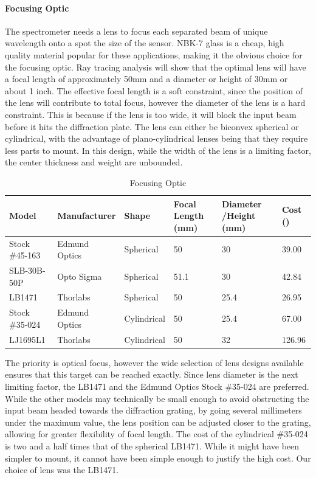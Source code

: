 \paragraph{Focusing Optic}
The spectrometer needs a lens to focus each separated beam of unique wavelength onto a spot the size of the sensor. NBK-7 glass is a cheap, high quality material popular for these applications, making it the obvious choice for the focusing optic. Ray tracing analysis will show that the optimal lens will have a focal length of approximately 50mm and a diameter or height of 30mm or about 1 inch. The effective focal length is a soft constraint, since the position of the lens will contribute to total focus, however the diameter of the lens is a hard constraint. This is because if the lens is too wide, it will block the input beam before it hits the diffraction plate. The lens can either be biconvex spherical or cylindrical, with the advantage of plano-cylindrical lenses being that they require less parts to mount. In this design, while the width of the lens is a limiting factor, the center thickness and weight are unbounded.

\begin{table}[H]
	\centering
	\label{table:Focusing Optic}
	\caption{Focusing Optic}
	\bigskip
	\begin{tabular}{|p{3cm}|p{2.5cm}|p{2cm}|p{1.5cm}|p{1.75cm}|p{1.25cm}|}
	\hline
	Model & Manufacturer & Shape & Focal Length (mm) & Diameter /Height (mm) & Cost (\textdollar)\\
	\hline
	Stock \#45-163 & Edmund Optics & Spherical & 50 & 30 & 39.00\\
	\hline
	SLB-30B-50P & Opto Sigma & Spherical & 51.1 & 30 & 42.84\\
	\hline
	LB1471 & Thorlabs & Spherical & 50 & 25.4 & 26.95\\
	\hline
	Stock \#35-024 & Edmund Optics & Cylindrical & 50 & 25.4 & 67.00\\
	\hline
	LJ1695L1 & Thorlabs & Cylindrical & 50 & 32 & 126.96\\
	\hline
	\end{tabular}
\end{table}

The priority is optical focus, however the wide selection of lens designs available ensures that this target can be reached exactly. Since lens diameter is the next limiting factor, the LB1471 and the Edmund Optics Stock \#35-024 are preferred. While the other models may technically be small enough to avoid obstructing the input beam headed towards the diffraction grating, by going several millimeters under the maximum value, the lens position can be adjusted closer to the grating, allowing for greater flexibility of focal length. The cost of the cylindrical \#35-024 is two and a half times that of the spherical LB1471. While it might have been simpler to mount, it cannot have been simple enough to justify the high cost. Our choice of lens was the LB1471. 

